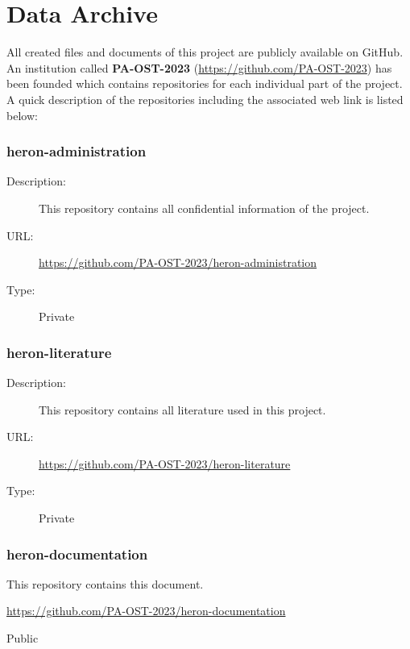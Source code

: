 \section{Data Archive} \label{Data Archive}
All created files and documents of this project are publicly available on GitHub. An institution called \textbf{PA-OST-2023} (\url{https://github.com/PA-OST-2023}) has been founded which contains repositories for each individual part of the project.
A quick description of the repositories including the associated web link is listed below:

\subsubsection{heron-administration} \vspace{-0.2cm}
\begin{description}
	\item[Description:] This repository contains all confidential information of the project.\vspace{-0.25cm}
	\item[URL:] \url{https://github.com/PA-OST-2023/heron-administration}\vspace{-0.25cm}
	\item[Type:] Private\vspace{-0.25cm}
\end{description}

\subsubsection{heron-literature} \vspace{-0.2cm}
\begin{description}
	\item[Description:] This repository contains all literature used in this project.\vspace{-0.25cm}
	\item[URL:] \url{https://github.com/PA-OST-2023/heron-literature}\vspace{-0.25cm}
	\item[Type:] Private\vspace{-0.25cm}
\end{description}

\subsubsection{heron-documentation} \vspace{-0.2cm}
\begin{description}
	\hfuzz=35.0pt
	\item[Description:] This repository contains this document.\vspace{-0.25cm}
	\item[URL:] \url{https://github.com/PA-OST-2023/heron-documentation}\vspace{-0.25cm}
	\item[Type:] Public\vspace{-0.25cm}
\end{description}

